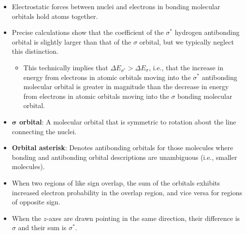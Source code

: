 \documentclass[../notes.tex]{subfiles}
\begin{document}
\begin{itemize}
    \item Electrostatic forces between nuclei and electrons in bonding molecular orbitals hold atoms together.
    \item {}Precise calculations show that the coefficient of the $\sigma^*$ hydrogen antibonding orbital is slightly larger than that of the $\sigma$ orbital, but we typically neglect this distinction.
    \begin{itemize}
        \item This technically implies that $\Delta E_{\sigma^*}>\Delta E_\sigma$, i.e., that the increase in energy from electrons in atomic orbitals moving into the $\sigma^*$ antibonding molecular orbital is greater in magnitude than the decrease in energy from electrons in atomic orbitals moving into the $\sigma$ bonding molecular orbital.
    \end{itemize}
    \item \textbf{$\bm{\sigma}$ orbital}: A molecular orbital that is symmetric to rotation about the line connecting the nuclei.
    \item \textbf{Orbital asterisk}: Denotes antibonding orbitals for those molecules where bonding and antibonding orbital descriptions are unambiguous (i.e., smaller molecules).
    \item When two regions of like sign overlap, the sum of the orbitals exhibits increased electron probability in the overlap region, and vice versa for regions of opposite sign.
    \item When the $z$-axes are drawn pointing in the same direction, their difference is $\sigma$ and their sum is $\sigma^*$.
    \begin{figure}[h!]
        \centering
        \begin{subfigure}[b]{0.4\linewidth}
            \centering
\end{subfigure}
\end{figure}
\end{itemize}
\end{document}
